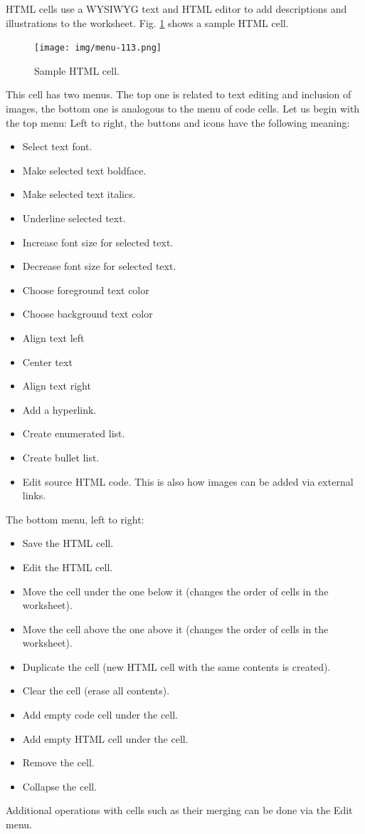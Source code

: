 HTML cells use a WYSIWYG text and HTML editor 
to add descriptions and illustrations to the worksheet. Fig. 
\ref{fig:menu-112} shows a sample HTML cell.

\begin{figure}[!ht]
\begin{center}
\texttt{[image: img/menu-113.png]}
\vspace{-0mm}
\caption{Sample HTML cell.}
\label{fig:menu-112}
\end{center}
\end{figure}
\noindent

\noindent
This cell has two menus. The top one is related to text editing and 
inclusion of images, the bottom one is analogous to the menu of 
code cells. Let us begin with the top menu:
Left to right, the buttons and icons have the following meaning: 
\begin{itemize}
\item Select text font. 
\item Make selected text boldface.
\item Make selected text italics.
\item Underline selected text.
\item Increase font size for selected text.
\item Decrease font size for selected text.
\item Choose foreground text color
\item Choose background text color
\item Align text left
\item Center text
\item Align text right 
\item Add a hyperlink.
\item Create enumerated list.
\item Create bullet list.
\item Edit source HTML code. This is also how images can be added via external links.
\end{itemize}
The bottom menu, left to right:
\begin{itemize}
\item Save the HTML cell.
\item Edit the HTML cell.
\item Move the cell under the one below it (changes the order of cells in the worksheet).
\item Move the cell above the one above it (changes the order of cells in the worksheet).
\item Duplicate the cell (new HTML cell with the same contents is created).
\item Clear the cell (erase all contents).
\item Add empty code cell under the cell.
\item Add empty HTML cell under the cell.
\item Remove the cell.
\item Collapse the cell. 
\end{itemize}
Additional operations with cells such as their merging can be done via
the Edit menu.

